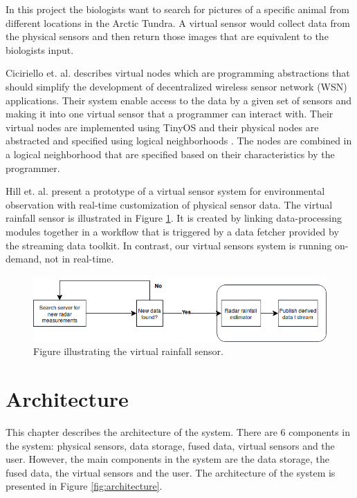 \documentclass[USenglish]{uit-thesis}
\begin{document}
In this project the biologists want to search for pictures of a specific animal from different locations in the Arctic Tundra. A virtual sensor would collect data from the physical sensors and then return those images that are equivalent to the biologists input.

Ciciriello et. al.\cite{Ciciriello} describes virtual nodes which are programming abstractions that should simplify the development of decentralized wireless sensor network (WSN) applications. Their system enable access to the data by a given set of sensors and making it into one virtual sensor that a programmer can interact with. Their virtual nodes are implemented using TinyOS \cite{TinyOS} and their physical nodes are abstracted and specified using logical neighborhoods \cite{Mottola2006}\cite{Mottola2006_2}. The nodes are combined in a logical neighborhood that are specified based on their characteristics by the programmer. 

Hill et. al. \cite{hill} present a prototype of a virtual sensor system for environmental observation with real-time customization of physical sensor data. 
The virtual rainfall sensor is illustrated in Figure \ref{fig:rainfall_sensor}. It is created by linking data-processing modules together in a workflow that is triggered by a data fetcher provided by the streaming data toolkit.
In contrast, our virtual sensors system is running on-demand, not in real-time.

\begin{figure}
\centering
\includegraphics[width=\textwidth]{rainfall_sensor.png}
\caption{Figure illustrating the virtual rainfall sensor.}
\label{fig:rainfall_sensor}
\end{figure}



\chapter{Architecture}
This chapter describes the architecture of the system.
There are 6 components in the system: physical sensors, data storage, fused data, virtual sensors and the user. However, the main components in the system are the data storage, the fused data, the virtual sensors and the user.
The architecture of the system is presented in Figure \ref{fig:architecture}.
\end{document}
